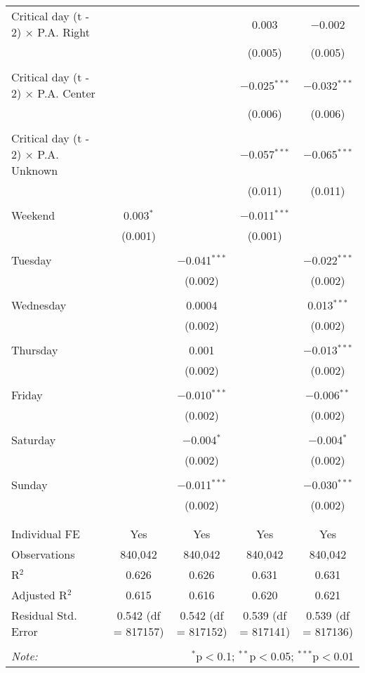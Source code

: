 \documentclass[
]{article}
\begin{document}
\begin{table}[!htbp]
{\begin{tabular}{@{\extracolsep{5pt}}lcccc}
 Critical day (t - 2) $\times$ P.A. Right &  &  & 0.003 & $-$0.002 \\ 
  &  &  & (0.005) & (0.005) \\ 
  & & & & \\ 
 Critical day (t - 2) $\times$ P.A. Center &  &  & $-$0.025$^{***}$ & $-$0.032$^{***}$ \\ 
  &  &  & (0.006) & (0.006) \\ 
  & & & & \\ 
 Critical day (t - 2) $\times$ P.A. Unknown &  &  & $-$0.057$^{***}$ & $-$0.065$^{***}$ \\ 
  &  &  & (0.011) & (0.011) \\ 
  & & & & \\ 
 Weekend & 0.003$^{*}$ &  & $-$0.011$^{***}$ &  \\ 
  & (0.001) &  & (0.001) &  \\ 
  & & & & \\ 
 Tuesday &  & $-$0.041$^{***}$ &  & $-$0.022$^{***}$ \\ 
  &  & (0.002) &  & (0.002) \\ 
  & & & & \\ 
 Wednesday &  & 0.0004 &  & 0.013$^{***}$ \\ 
  &  & (0.002) &  & (0.002) \\ 
  & & & & \\ 
 Thursday &  & 0.001 &  & $-$0.013$^{***}$ \\ 
  &  & (0.002) &  & (0.002) \\ 
  & & & & \\ 
 Friday &  & $-$0.010$^{***}$ &  & $-$0.006$^{**}$ \\ 
  &  & (0.002) &  & (0.002) \\ 
  & & & & \\ 
 Saturday &  & $-$0.004$^{*}$ &  & $-$0.004$^{*}$ \\ 
  &  & (0.002) &  & (0.002) \\ 
  & & & & \\ 
 Sunday &  & $-$0.011$^{***}$ &  & $-$0.030$^{***}$ \\ 
  &  & (0.002) &  & (0.002) \\ 
  & & & & \\ 
\hline \\[-1.8ex] 
Individual FE & Yes & Yes & Yes & Yes \\ 
Observations & 840,042 & 840,042 & 840,042 & 840,042 \\ 
R$^{2}$ & 0.626 & 0.626 & 0.631 & 0.631 \\ 
Adjusted R$^{2}$ & 0.615 & 0.616 & 0.620 & 0.621 \\ 
Residual Std. Error & 0.542 (df = 817157) & 0.542 (df = 817152) & 0.539 (df = 817141) & 0.539 (df = 817136) \\ 
\hline 
\hline \\[-1.8ex] 
\textit{Note:}  & \multicolumn{4}{r}{$^{*}$p$<$0.1; $^{**}$p$<$0.05; $^{***}$p$<$0.01} \\ 
\end{tabular}
} 
\end{table} 
\newpage
\end{document}
